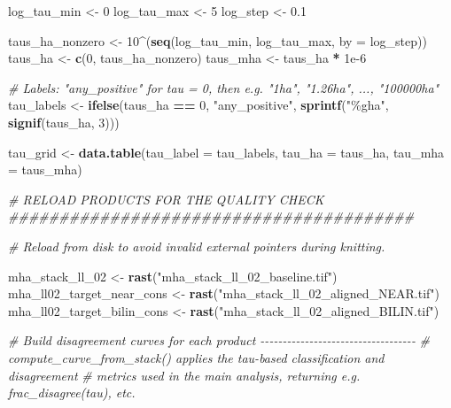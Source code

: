 \documentclass[
  11pt,
]{article}
\newenvironment{Shaded}{\begin{snugshade}}{\end{snugshade}}
\newcommand{\AttributeTok}[1]{\textcolor[rgb]{0.13,0.29,0.53}{#1}}
\newcommand{\CommentTok}[1]{\textcolor[rgb]{0.56,0.35,0.01}{\textit{#1}}}
\newcommand{\DecValTok}[1]{\textcolor[rgb]{0.00,0.00,0.81}{#1}}
\newcommand{\FloatTok}[1]{\textcolor[rgb]{0.00,0.00,0.81}{#1}}
\newcommand{\FunctionTok}[1]{\textcolor[rgb]{0.13,0.29,0.53}{\textbf{#1}}}
\newcommand{\NormalTok}[1]{#1}
\newcommand{\OtherTok}[1]{\textcolor[rgb]{0.56,0.35,0.01}{#1}}
\newcommand{\SpecialCharTok}[1]{\textcolor[rgb]{0.81,0.36,0.00}{\textbf{#1}}}
\newcommand{\StringTok}[1]{\textcolor[rgb]{0.31,0.60,0.02}{#1}}
\begin{document}
\begin{Shaded}
\begin{Highlighting}[]
\NormalTok{log\_tau\_min }\OtherTok{\textless{}{-}} \DecValTok{0}
\NormalTok{log\_tau\_max }\OtherTok{\textless{}{-}} \DecValTok{5}
\NormalTok{log\_step }\OtherTok{\textless{}{-}} \FloatTok{0.1}

\NormalTok{taus\_ha\_nonzero }\OtherTok{\textless{}{-}} \DecValTok{10}\SpecialCharTok{\^{}}\NormalTok{(}\FunctionTok{seq}\NormalTok{(log\_tau\_min, log\_tau\_max, }\AttributeTok{by =}\NormalTok{ log\_step))}
\NormalTok{taus\_ha }\OtherTok{\textless{}{-}} \FunctionTok{c}\NormalTok{(}\DecValTok{0}\NormalTok{, taus\_ha\_nonzero)}
\NormalTok{taus\_mha }\OtherTok{\textless{}{-}}\NormalTok{ taus\_ha }\SpecialCharTok{*} \FloatTok{1e{-}6}

\CommentTok{\# Labels: "any\_positive" for tau = 0, then e.g. "1ha", "1.26ha", ..., "100000ha"}
\NormalTok{tau\_labels }\OtherTok{\textless{}{-}} \FunctionTok{ifelse}\NormalTok{(taus\_ha }\SpecialCharTok{==} \DecValTok{0}\NormalTok{, }\StringTok{"any\_positive"}\NormalTok{,}
                     \FunctionTok{sprintf}\NormalTok{(}\StringTok{"\%gha"}\NormalTok{, }\FunctionTok{signif}\NormalTok{(taus\_ha, }\DecValTok{3}\NormalTok{)))}

\NormalTok{tau\_grid }\OtherTok{\textless{}{-}} \FunctionTok{data.table}\NormalTok{(}\AttributeTok{tau\_label =}\NormalTok{ tau\_labels,}
                       \AttributeTok{tau\_ha =}\NormalTok{ taus\_ha,}
                       \AttributeTok{tau\_mha =}\NormalTok{ taus\_mha)}

\CommentTok{\# RELOAD PRODUCTS FOR THE QUALITY CHECK \#\#\#\#\#\#\#\#\#\#\#\#\#\#\#\#\#\#\#\#\#\#\#\#\#\#\#\#\#\#\#\#\#\#\#\#\#\#\#\#}

\CommentTok{\# Reload from disk to avoid invalid external pointers during knitting.}

\NormalTok{mha\_stack\_ll\_02 }\OtherTok{\textless{}{-}} \FunctionTok{rast}\NormalTok{(}\StringTok{"mha\_stack\_ll\_02\_baseline.tif"}\NormalTok{)}
\NormalTok{mha\_ll02\_target\_near\_cons }\OtherTok{\textless{}{-}} \FunctionTok{rast}\NormalTok{(}\StringTok{"mha\_stack\_ll\_02\_aligned\_NEAR.tif"}\NormalTok{)}
\NormalTok{mha\_ll02\_target\_bilin\_cons }\OtherTok{\textless{}{-}} \FunctionTok{rast}\NormalTok{(}\StringTok{"mha\_stack\_ll\_02\_aligned\_BILIN.tif"}\NormalTok{)}

\CommentTok{\# Build disagreement curves for each product {-}{-}{-}{-}{-}{-}{-}{-}{-}{-}{-}{-}{-}{-}{-}{-}{-}{-}{-}{-}{-}{-}{-}{-}{-}{-}{-}{-}{-}{-}{-}{-}{-}{-}{-}}
\CommentTok{\# compute\_curve\_from\_stack() applies the tau{-}based classification and disagreement}
\CommentTok{\# metrics used in the main analysis, returning e.g. frac\_disagree(tau), etc.}


\end{Highlighting}
\end{Shaded}
\end{document}
